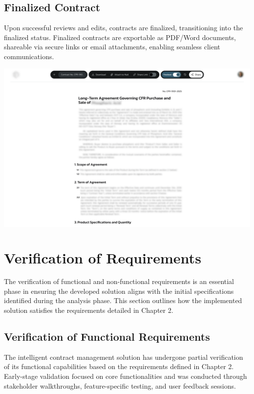 \subsection{Finalized Contract}
Upon successful reviews and edits, contracts are finalized, transitioning into the finalized status. Finalized contracts are exportable as PDF/Word documents, shareable via secure links or email attachments, enabling seamless client communications.

\begin{center}
    \centering
    \includegraphics[width=1\textwidth]{Images/Contract Status - Finalized.png}
    \label{fig:contract_status_finalized}
\end{center}

\section{Verification of Requirements}
The verification of functional and non-functional requirements is an essential phase in ensuring the developed solution aligns with the initial specifications identified during the analysis phase. This section outlines how the implemented solution satisfies the requirements detailed in Chapter 2.

\subsection{Verification of Functional Requirements}
The intelligent contract management solution has undergone partial verification of its functional capabilities based on the requirements defined in Chapter 2. Early-stage validation focused on core functionalities and was conducted through stakeholder walkthroughs, feature-specific testing, and user feedback sessions.\mynewline

